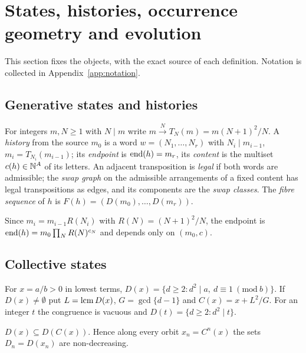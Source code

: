 \section{States, histories, occurrence geometry and evolution}\label{sec:objects}
This section fixes the objects, with the exact source of each definition. Notation is collected in Appendix~\ref{app:notation}.

\subsection{Generative states and histories}
\begin{definition}
For integers $m,N\ge1$ with $N\mid m$ write $m\xrightarrow{N}T_N(m)=m(N+1)^2/N$. A \emph{history} from the source $m_0$ is a word $w=(N_1,\dots,N_r)$ with $N_i\mid m_{i-1}$, $m_i=T_{N_i}(m_{i-1})$; its \emph{endpoint} is $\operatorname{end}(h)=m_r$, its \emph{content} is the multiset $c(h)\in\mathbb N^{A}$ of its letters. An adjacent transposition is \emph{legal} if both words are admissible; the \emph{swap graph} on the admissible arrangements of a fixed content has legal transpositions as edges, and its components are the \emph{swap classes}. The \emph{fibre sequence} of $h$ is $F(h)=(D(m_0),\dots,D(m_r))$.
\end{definition}
Since $m_i=m_{i-1}R(N_i)$ with $R(N)=(N+1)^2/N$, the endpoint is $\operatorname{end}(h)=m_0\prod_NR(N)^{c_N}$ and depends only on $(m_0,c)$.

\subsection{Collective states}
\begin{definition}
For $x=a/b>0$ in lowest terms, $D(x)=\{d\ge2:d^2\mid a,\ d\equiv1\ (\mathrm{mod}\ b)\}$. If $D(x)\ne\emptyset$ put $L=\operatorname{lcm} D(x)$, $G=\gcd\{d-1\}$ and $C(x)=x+L^2/G$. For an integer $t$ the congruence is vacuous and $D(t)=\{d\ge2:d^2\mid t\}$.
\end{definition}
\begin{lemma}\label{lem:M-cited}
$D(x)\subseteq D(C(x))$. Hence along every orbit $x_n=C^n(x)$ the sets $D_n=D(x_n)$ are non-decreasing.
\end{lemma}

